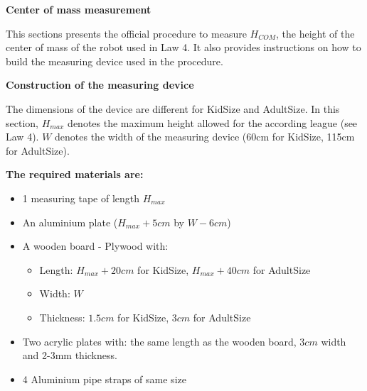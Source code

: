\clearpage
\sffamily
{\bfseries\color[rgb]{0.4,0.4,0.4} Center of mass measurement}
{}

\bigskip

This sections presents the official procedure to measure $H_{COM}$,
the height of the center of mass of the robot used in Law 4.
It also provides instructions on how to build the measuring device used in the
procedure.

\bigskip

{\bfseries Construction of the measuring device}

\headlinebox

The dimensions of the device are different for KidSize and AdultSize.
In this section, $H_{max}$ denotes the maximum height allowed for the
according league (see Law 4).
$W$ denotes the width of the measuring device (60cm for KidSize, 115cm for
AdultSize).

\bigskip

\textbf{The required materials are:}
\begin{itemize}
\item 1 measuring tape of length $H_{max}$
\item An aluminium plate ($H_{max}+5cm$ by $W - 6cm$)
\item A wooden board - Plywood with:
  \begin{itemize}
  \item Length: $H_{max}+20cm$ for KidSize, $H_{max}+40cm$ for AdultSize
  \item Width: $W$
  \item Thickness: $1.5cm$ for KidSize, $3cm$ for AdultSize
  \end{itemize}
\item Two acrylic plates with: the same length as the wooden board, $3cm$ width
  and 2-3mm thickness.
\item 4 Aluminium pipe straps of same size
\end{itemize}

